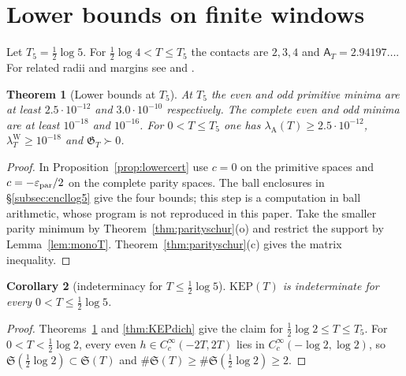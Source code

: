 \documentclass[10pt]{amsart}
\newtheorem{theorem}{Theorem}[section]
\newtheorem{corollary}[theorem]{Corollary}
\theoremstyle{definition}
\theoremstyle{remark}
\newcommand{\lamW}{\lambda^{\mathrm W}_T}
\newcommand{\lamA}{\lambda_{\mathrm A}(T)}
\newcommand{\Aconst}{\mathsf A_T}
\begin{document}
\section{Lower bounds on finite windows}\label{sec:log5}

Let $T_5=\tfrac12\log5$. For $\tfrac12\log4<T\le T_5$ the
contacts are $2,3,4$ and $\Aconst=2.94197\ldots$.
For related radii and margins see \cite[Thm.~1.2]{Zhu2026}
and \cite[Thms.~A, B]{Liu2026}.

\begin{theorem}[Lower bounds at $T_5$]\label{thm:log5W}\label{thm:log5A}
At $T_5$ the even and odd primitive minima are at least
$2.5\cdot10^{-12}$ and $3.0\cdot10^{-10}$ respectively.
The complete even and odd minima are at least $10^{-18}$ and
$10^{-16}$. For $0<T\le T_5$ one has $\lamA\ge2.5\cdot10^{-12}$,
$\lamW\ge10^{-18}$ and $\mathfrak G_T\succ0$.
\end{theorem}
\begin{proof}
In Proposition~\ref{prop:lowercert} use $c=0$ on the primitive spaces
and $c=-\varepsilon_{\rm par}/2$ on the complete parity spaces.
The ball enclosures in \S\ref{subsec:encllog5} give the four bounds; this step is a
computation in ball arithmetic, whose program is not reproduced in this paper.
Take the smaller parity minimum by Theorem~\ref{thm:parityschur}(o)
and restrict the support by Lemma~\ref{lem:monoT}.
Theorem~\ref{thm:parityschur}(c) gives the matrix inequality.
\end{proof}

\begin{corollary}[indeterminacy for $T\le\frac12\log5$]\label{cor:KEPlog5}
$\mathrm{KEP}(T)$ is indeterminate for every $0<T\le\frac12\log5$.
\end{corollary}
\begin{proof}
Theorems~\ref{thm:log5W} and \ref{thm:KEPdich} give the claim for
$\frac12\log2\le T\le T_5$. For $0<T<\frac12\log2$, every even $h\in C_c^\infty(-2T,2T)$ lies in
$C_c^\infty(-\log2,\log2)$, so $\mathfrak S(\frac12\log2)\subset\mathfrak S(T)$ and
$\#\mathfrak S(T)\ge\#\mathfrak S(\frac12\log2)\ge2$.
\end{proof}
\end{document}
